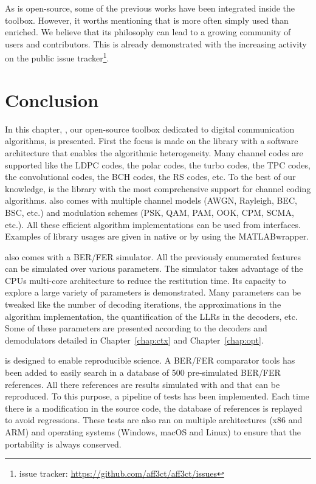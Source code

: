 As \AFFECT is open-source, some of the previous works have been integrated
inside the toolbox. However, it worths mentioning that \AFFECT is more often
simply used than enriched. We believe that its philosophy can lead to a growing
community of users and contributors. This is already demonstrated with the
increasing activity on the public issue tracker\footnote{\AFFECT issue tracker:
\url{https://github.com/aff3ct/aff3ct/issues}}.

\section{Conclusion}

In this chapter, \AFFECT, our open-source toolbox dedicated to digital
communication algorithms, is presented. First the focus is made on the library
with a software architecture that enables the algorithmic heterogeneity. Many
channel codes are supported like the LDPC codes, the polar codes, the turbo
codes, the TPC codes, the convolutional codes, the BCH codes, the RS codes, etc.
To the best of our knowledge, \AFFECT is the library with the most comprehensive
support for channel coding algorithms. \AFFECT also comes with multiple channel
models (AWGN, Rayleigh, BEC, BSC, etc.) and modulation schemes (PSK, QAM, PAM,
OOK, CPM, SCMA, etc.). All these efficient algorithm implementations can be
used from interfaces. Examples of library usages are given in native \Cxx or
by using the MATLAB\R wrapper.

\AFFECT also comes with a BER/FER simulator. All the previously enumerated
features can be simulated over various parameters. The simulator takes advantage
of the CPUs multi-core architecture to reduce the restitution time. Its capacity
to explore a large variety of parameters is demonstrated. Many parameters can be
tweaked like the number of decoding iterations, the approximations in the
algorithm implementation, the quantification of the LLRs in the decoders, etc.
Some of these parameters are presented according to the decoders and
demodulators detailed in Chapter~\ref{chap:ctx} and Chapter~\ref{chap:opt}.

\AFFECT is designed to enable reproducible science. A BER/FER comparator tools
has been added to easily search in a database of 500 pre-simulated BER/FER
references. All there references are results simulated with \AFFECT and that can
be reproduced. To this purpose, a pipeline of tests has been implemented. Each
time there is a modification in the source code, the database of references is
replayed to avoid regressions. These tests are also ran on multiple
architectures (x86 and ARM\R) and operating systems (Windows, macOS and Linux)
to ensure that the portability is always conserved.

